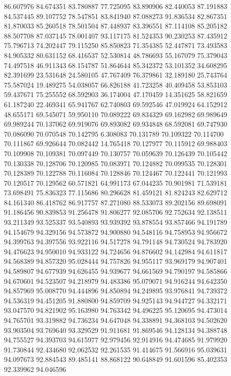 86.607976
84.674351
83.780887
77.725095
83.890906
82.440053
87.191883
84.537445
89.107752
78.547851
83.841940
87.088273
91.836534
82.867351
81.870033
85.260518
78.501504
87.448937
83.396551
87.114108
85.205182
88.507708
87.037145
78.001407
93.117175
81.524353
90.230253
87.435912
75.796713
74.202447
79.115250
85.850823
71.354385
52.447871
73.493583
84.905332
80.631152
68.416537
52.530814
48.786693
55.167079
75.379043
74.497518
46.911343
68.154787
51.864644
85.342372
53.101352
34.608295
82.391699
23.531648
24.580105
47.767409
76.379861
32.189180
25.743764
75.587024
19.489275
54.038057
66.826188
41.723258
40.409458
53.853103
59.437671
75.255552
68.592903
36.174004
47.170459
14.351625
58.821659
61.187240
22.469341
65.941767
62.740803
69.592546
47.019924
64.152912
48.655171
69.545071
59.950110
70.089222
69.834329
69.162982
69.989649
69.989244
70.137062
69.919076
69.893082
69.934848
68.592081
69.747930
70.086090
70.070548
70.142795
6.308083
70.131789
70.109322
70.114700
70.111867
69.926644
70.082442
14.765418
70.127977
70.115912
69.988403
70.109908
70.109381
70.097449
70.130757
70.059639
70.126439
70.105442
70.130338
70.128706
70.120985
70.083971
70.124882
70.099535
70.128301
70.128389
70.122788
70.116084
70.128846
70.124467
70.122441
70.121993
70.120517
70.129562
60.571821
64.991173
67.044235
70.901981
71.539181
73.698491
75.836323
77.115686
80.296628
81.459121
81.824243
82.629712
84.161340
86.418762
86.917757
87.271080
88.533073
89.202156
89.698091
91.186456
90.839853
91.256478
91.806277
92.085706
92.752634
92.138511
93.211349
93.525337
93.540893
93.939392
93.878554
93.857466
94.191789
94.154679
94.329156
94.573872
94.900880
94.548116
94.758953
94.956672
94.399763
94.397556
93.922116
94.517278
94.791148
94.730524
94.783920
94.476623
94.950010
94.933122
94.724656
94.876602
94.142984
94.611817
94.568389
94.857320
95.028444
94.757826
94.955117
93.969179
94.907401
94.589807
94.677939
94.626455
94.939677
94.661569
94.790197
94.585866
94.670601
94.523507
94.218979
94.483386
95.079071
94.916244
94.642350
94.857969
95.008770
94.444896
94.850894
94.249895
93.976841
94.739372
94.536319
94.451205
91.880800
94.859709
94.925143
94.944727
94.332171
93.047570
94.821902
95.163980
94.763342
94.496225
95.120695
94.473014
94.765701
93.319882
94.736234
94.647048
94.338891
94.368103
94.502620
93.903504
93.769640
93.329529
91.911681
91.869546
94.128134
94.388748
94.755527
94.393703
94.615977
92.979456
92.914916
94.474685
91.979920
91.730844
92.434680
92.062532
92.261535
91.414675
91.566916
95.039631
94.097673
92.884543
89.485141
88.868122
90.648849
91.601596
85.402353
92.339962
94.046596
